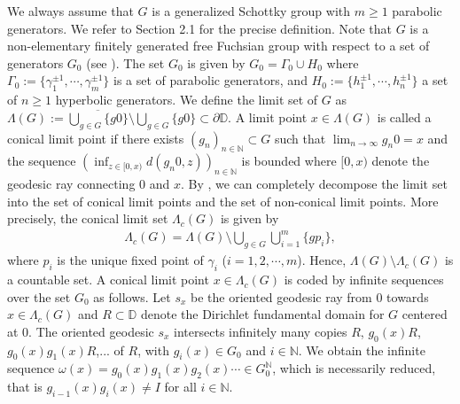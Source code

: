 \documentclass{article}
\theoremstyle{definition}
\begin{document}
We always assume that $G$ is a  generalized Schottky group with $m\ge1$ parabolic generators. We refer to Section 2.1 for the precise definition. Note that $G$ is a non-elementary finitely generated free Fuchsian group with respect to a set of generators $G_0$ (see \cite[Proposition 1.6]{Dal}).  The set $G_0$ is given by $G_0=\Gamma_0\cup H_0$ where $\Gamma_0:=\{\gamma_1^{\pm 1},\cdots,\gamma_m^{\pm 1}\}$ is a set of parabolic generators,  and $H_0:=\{h_1^{\pm1},\cdots,h_n^{\pm1}\}$ a set of $n\ge 1$ hyperbolic generators. 
 We define the limit set of $G$ as $\Lambda(G):=\overline{\bigcup_{g\in G}\{g0\}}\setminus\bigcup_{g\in G}\{g0\} \subset \partial{\mathbb{D}}$. A limit point $x\in\Lambda(G)$ is called a conical limit point if there exists $(g_n)_{n\in\mathbb{N}}\subset G$ such that $\lim_{n\to\infty}g_n0=x$ and the sequence $(\inf_{z\in[0,x)}d(g_n0,z))_{n\in\mathbb{N}}$ is bounded where $[0,x)$ denote the geodesic ray connecting $0$ and $x$. By \cite[\ 10.2.5]  {beardon2012geometry}, we can completely decompose the limit set into the  set of conical limit points and the set of non-conical limit points. More precisely, the conical limit set $\Lambda_c(G)$ is given by 
\begin{align}\label{eq decomposition of limit set}
    \Lambda_c(G)=\Lambda(G)\setminus\bigcup_{g\in G }\bigcup_{i=1}^m\{gp_i\},
\end{align}
where $p_i$ is the unique fixed point of $\gamma_i$ ($i=1,2,\cdots,m$).
Hence, $\Lambda(G)\setminus\Lambda_c(G)$ is a countable set.
A conical limit point $x\in \Lambda_c(G)$ is coded by infinite sequences over the set {$G_0$} as follows. 
Let $s_x$ be the oriented geodesic ray from 0 towards $x\in\Lambda_c(G)$ and $R\subset \mathbb{D}$ denote the Dirichlet fundamental domain for $G$ centered at $0$. The oriented geodesic $s_x$ intersects infinitely many copies $R$, $g_0(x)R$, $g_0(x)g_1(x)R$,... of $R$, with $g_i(x)\in G_0$ and $i\in\mathbb{N}$. We obtain the infinite sequence $\omega(x)=g_0(x)g_1(x)g_2(x)\cdots\in G_0^{\mathbb{N}}$, which is necessarily reduced,  that is $g_{i-1}(x)g_i(x)\neq I$ for all $i\in\mathbb{N}$. 
\end{document}
